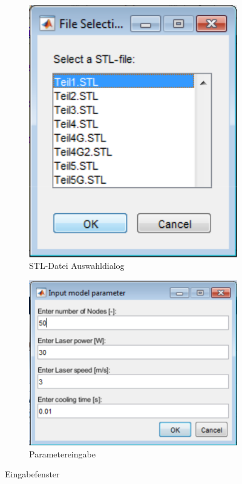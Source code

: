 \documentclass{scrartcl}
\begin{document}
\begin{figure}[H]
\centering
\begin{subfigure}[t]{0.4\textwidth}
\centering
\includegraphics[width=\textwidth]{bild2.png}
\caption{STL-Datei Auswahldialog}
\label{fig:1}
\end{subfigure}
\begin{subfigure}[t]{0.55\textwidth}
\centering
\includegraphics[width=\textwidth]{bild1.png}
\caption{Parametereingabe}
\label{fig:2}
\end{subfigure}
\caption{Eingabefenster}
\end{figure}
\end{document}
